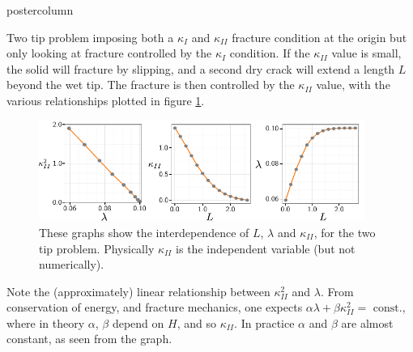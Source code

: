 \documentclass{beamer}
\begin{document}
\begin{frame}
\begin{columns}
\begin{column}{.57\textwidth}
\begin{beamercolorbox}[center]{postercolumn}
\begin{minipage}{.98\textwidth}
{\begin{myblock}{Two tip problem}
imposing both a $\kappa_I$ and $\kappa_{II}$ fracture condition at the origin but 
only looking at fracture controlled by the $\kappa_I$ condition. If the 
$\kappa_{II}$ value is small, the solid will fracture by slipping,
and a second dry crack will extend a length $L$ beyond the wet tip. The fracture
is then controlled by the $\kappa_{II}$ value, with the various relationships
plotted in figure \ref{fig:KI0}.
\begin{figure}
\centering\includegraphics[width=0.95\textwidth]{KI-0-poster.pdf}
\caption{These graphs show the interdependence of $L$, $\lambda$ and 
         $\kappa_{II}$, for the two tip problem. Physically $\kappa_{II}$ is
         the independent variable (but not numerically).}\label{fig:KI0}
\end{figure}
Note the (approximately) linear relationship between 
$\kappa_{II}^2$ and $\lambda$. From conservation of energy, and fracture 
mechanics, one expects $\alpha \lambda + \beta
\kappa_{II}^2 = \mbox{ const.}$, where in theory $\alpha$, $\beta$ depend
on $H$, and so $\kappa_{II}$. In practice $\alpha$ and $\beta$ are almost
constant, as seen from the graph.
 

\end{myblock}}
\end{minipage}
\end{beamercolorbox}
\end{column}
\end{columns}
\end{frame}
\end{document}
